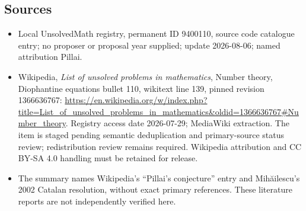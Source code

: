 \documentclass[11pt]{article}
\begin{document}
\subsection{Sources}
\begin{itemize}
\item Local UnsolvedMath registry, permanent ID 9400110, source code catalogue entry; no proposer or proposal year supplied; update 2026-08-06; named attribution Pillai.
\item Wikipedia, \emph{List of unsolved problems in mathematics}, Number theory, Diophantine equations bullet 110, wikitext line 139, pinned revision 1366636767: \url{https://en.wikipedia.org/w/index.php?title=List_of_unsolved_problems_in_mathematics&oldid=1366636767#Number_theory}. Registry access date 2026-07-29; MediaWiki extraction. The item is staged pending semantic deduplication and primary-source status review; redistribution review remains required. Wikipedia attribution and CC BY-SA 4.0 handling must be retained for release.
\item The summary names Wikipedia's ``Pillai's conjecture'' entry and Mih\u{a}ilescu's 2002 Catalan resolution, without exact primary references. These literature reports are not independently verified here.
\end{itemize}
\end{document}
